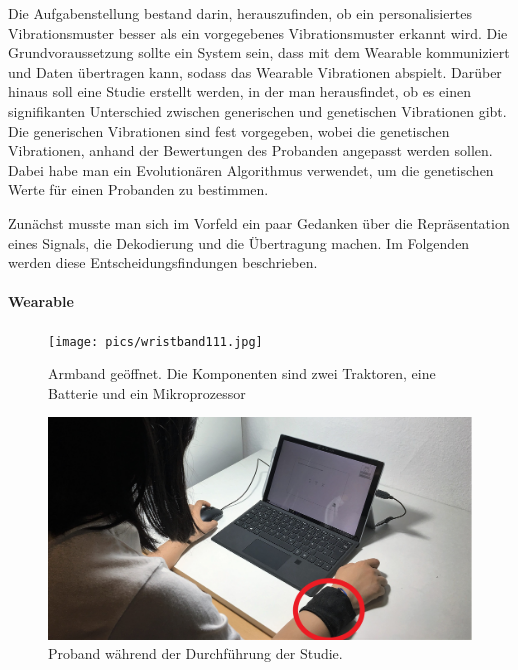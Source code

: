 
Die Aufgabenstellung bestand darin, herauszufinden, ob ein personalisiertes Vibrationsmuster besser als ein vorgegebenes Vibrationsmuster erkannt wird.
Die Grundvoraussetzung sollte ein System sein, dass mit dem Wearable kommuniziert und Daten {\"u}bertragen kann, sodass das Wearable Vibrationen abspielt. 
Dar{\"u}ber hinaus soll eine Studie erstellt werden, in der man herausfindet, ob es einen signifikanten Unterschied zwischen generischen und genetischen Vibrationen gibt. 
Die generischen Vibrationen sind fest vorgegeben, wobei die genetischen Vibrationen, anhand der Bewertungen des Probanden angepasst werden sollen. 
Dabei habe man ein Evolution{\"a}ren Algorithmus verwendet, um die genetischen Werte f{\"u}r einen Probanden zu bestimmen. 

Zun{\"a}chst musste man sich im Vorfeld ein paar Gedanken {\"u}ber die Repr{\"a}sentation eines Signals, die Dekodierung und die {\"U}bertragung machen.
Im Folgenden werden diese Entscheidungsfindungen beschrieben.

\paragraph{Wearable}

\begin{figure}
	\centering
    \texttt{[image: pics/wristband111.jpg]}
    \caption{Armband ge{\"o}ffnet. Die Komponenten sind zwei Traktoren, eine Batterie und ein Mikroprozessor}
    \label{fig:wristband1}
\end{figure}

\begin{figure}
	\centering
    \includegraphics[width=\textwidth]{pics/peter.jpg}
    \caption{Proband während der Durchführung der Studie.}
    \label{fig:wristband2}
\end{figure}

